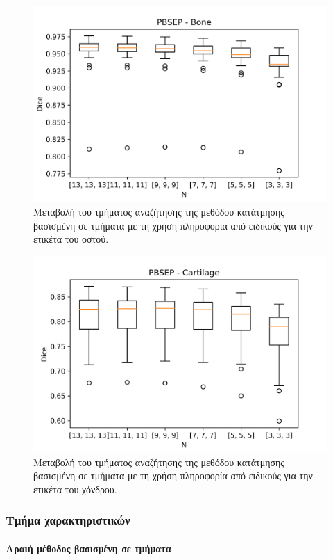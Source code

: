 \documentclass[a4paper,12pt]{article}
\newcommand{\paragraphLine}[1]{\paragraph{#1}\mbox{}\\}
\begin{document}
\begin{figure}[H]
    \centering
    \includegraphics[width=0.85\linewidth]{PBSEP_N_Bone_plot.png}
    \caption{Μεταβολή του τμήματος αναζήτησης της μεθόδου κατάτμησης βασισμένη
             σε τμήματα με τη χρήση πληροφορία από ειδικούς για την ετικέτα του
             οστού.}
    \label{fig:PBSEP:N:2}
\end{figure}

\begin{figure}[H]
    \centering
    \includegraphics[width=0.85\linewidth]{PBSEP_N_Cartilage_plot.png}
    \caption{Μεταβολή του τμήματος αναζήτησης της μεθόδου κατάτμησης βασισμένη
             σε τμήματα με τη χρήση πληροφορία από ειδικούς για την ετικέτα του
             χόνδρου.}
    \label{fig:PBSEP:N:3}
\end{figure}


\subsubsection{Τμήμα χαρακτηριστικών}

\paragraphLine{Αραιή μέθοδος βασισμένη σε τμήματα}
\end{document}
